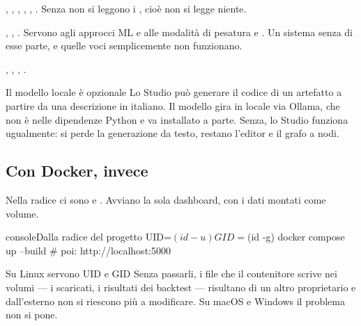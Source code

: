 \begin{description}[leftmargin = 1.6em, style = nextline, itemsep = 4pt]
  \item[Stack numerico] , , ,
    , , . Senza
     non si leggono i , cioè non si legge niente.
  \item[Machine learning] , , . Servono
    agli approcci ML e alle modalità di pesatura  e
    . Un sistema senza di esse parte, e quelle voci
    semplicemente non funzionano.
  \item[Sorgenti dati] , , ,
    .
\end{description}

\begin{nota}{Il modello locale è opzionale}
Lo Studio può generare il codice di un artefatto a partire da una descrizione
in italiano. Il modello gira in locale via Ollama, che non è nelle
dipendenze Python e va installato a parte. Senza, lo Studio funziona
ugualmente: si perde la generazione da testo, restano l'editor e il grafo a
nodi.
\end{nota}

\subsection{Con Docker, invece}

Nella radice ci sono  e . Avviano la
sola dashboard, con i dati montati come volume.

\begin{codiceInterno}{console}{Dalla radice del progetto}{}
UID=$(id -u) GID=$(id -g) docker compose up --build
# poi: http://localhost:5000
\end{codiceInterno}

\begin{attenzione}{Su Linux servono UID e GID}
Senza passarli, i file che il contenitore scrive nei volumi --- i
 scaricati, i risultati dei backtest --- risultano di un altro
proprietario e dall'esterno non si riescono più a modificare. Su macOS e
Windows il problema non si pone.
\end{attenzione}
